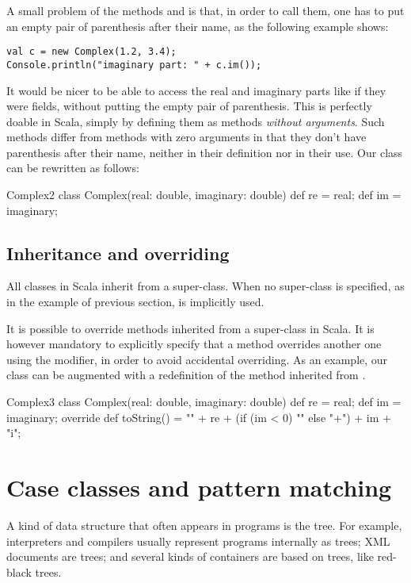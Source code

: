 \documentclass[a4paper,12pt,twoside,titlepage]{article}
\newcommand{\langname}[1]{#1\xspace}
\newcommand{\Scala}{\langname{Scala}}
\begin{document}
A small problem of the methods  and  is that, in
order to call them, one has to put an empty pair of parenthesis after
their name, as the following example shows:
\begin{lstlisting}[escapechar=\#]
val c = new Complex(1.2, 3.4);
Console.println("imaginary part: " + c.im());
\end{lstlisting}
It would be nicer to be able to access the real and imaginary parts
like if they were fields, without putting the empty pair of
parenthesis. This is perfectly doable in \Scala, simply by defining
them as methods \emph{without arguments}. Such methods differ from
methods with zero arguments in that they don't have parenthesis after
their name, neither in their definition nor in their use. Our
 class can be rewritten as follows:
\begin{scalaprogram}{Complex2}
class Complex(real: double, imaginary: double) {
  def re = real;
  def im = imaginary;
}
\end{scalaprogram}

\subsection{Inheritance and overriding}
\label{sec:inheritance}

All classes in \Scala inherit from a super-class. When no super-class
is specified, as in the  example of previous section,
 is implicitly used.

It is possible to override methods inherited from a super-class in
\Scala. It is however mandatory to explicitly specify that a method
overrides another one using the  modifier, in order to
avoid accidental overriding. As an example, our  class
can be augmented with a redefinition of the  method
inherited from .
\begin{scalaprogram}{Complex3}
class Complex(real: double, imaginary: double) {
  def re = real;
  def im = imaginary;
  override def toString() =
    "" + re + (if (im < 0) "" else "+") + im + "i";
}
\end{scalaprogram}

\section{Case classes and pattern matching}
\label{sec:case-classes-pattern}

A kind of data structure that often appears in programs is the tree.
For example, interpreters and compilers usually represent programs
internally as trees; XML documents are trees; and several kinds of
containers are based on trees, like red-black trees.
\end{document}
